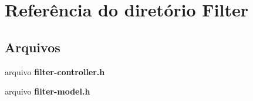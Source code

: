 \section{Referência do diretório Filter}
\label{dir_ab6f35e7f4b6c2daadc4588088cc155b}
\subsection*{Arquivos}
\begin{DoxyCompactItemize}
\item 
arquivo {\bf filter-\/controller.\+h}
\item 
arquivo {\bf filter-\/model.\+h}
\end{DoxyCompactItemize}
